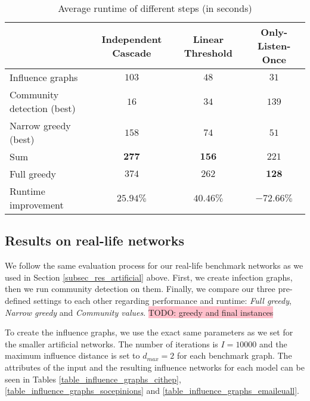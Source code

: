 \documentclass[pdflatex,sn-mathphys-num]{sn-jnl}
\begin{document}
\begin{table}[ht]
\caption{Average runtime of different steps (in seconds)}
\label{table_runtimes}
\begin{tabular}{@{}lccc@{}}
\toprule
& Independent Cascade & Linear Threshold & Only-Listen-Once \\
\midrule
Influence graphs & $103$ & $48$ & $31$ \\
Community detection (best)\footnotemark[3] & $16$ & $34$ & $139$ \\
Narrow greedy (best)\footnotemark[3] & $158$ & $74$ & $51$ \\
\midrule
Sum & $\mathbf{277}$ & $\mathbf{156}$ & $221$ \\
Full greedy & $374$ & $262$ & $\mathbf{128}$ \\
\midrule
Runtime improvement & $25.94\%$ & $40.46\%$ & $-72.66\%$ \\
\midrule
\end{tabular}
\end{table}


\subsection{Results on real-life networks}\label{subsec_res_reallife}

We follow the same evaluation process for our real-life benchmark networks as we used in Section \ref{subsec_res_artificial} above. First, we create infection graphs, then we run community detection on them. Finally, we compare our three pre-defined settings to each other regarding performance and runtime: \textit{Full greedy}, \textit{Narrow greedy} and \textit{Community values}. \colorbox{pink}{TODO: greedy and final instances}

To create the influence graphs, we use the exact same parameters as we set for the smaller artificial networks. The number of iterations is $I = 10000$ and the maximum influence distance is set to $d_{max} = 2$ for each benchmark graph. The attributes of the input and the resulting influence networks for each model can be seen in Tables \ref{table_influence_graphs_cithep}, \ref{table_influence_graphs_socepinions} and \ref{table_influence_graphs_emaileuall}.
\end{document}

